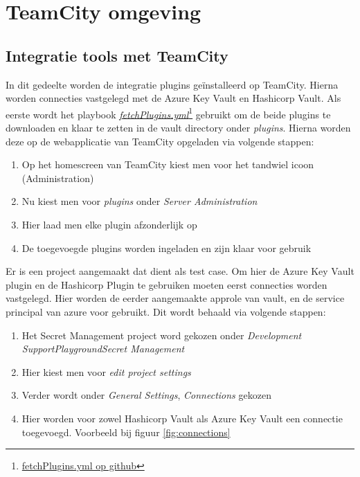 \section{TeamCity omgeving}
\subsection{Integratie tools met TeamCity}

In dit gedeelte worden de integratie plugins geïnstalleerd op TeamCity. Hierna worden connecties vastgelegd met de Azure Key Vault en Hashicorp Vault. Als eerste wordt het playbook \href{https://github.com/Rayenasr/Secrets-management-thesis/blob/main/vault/fetchPlugins.yml}{\textit{fetchPlugins.yml}}\footnote{\href{https://github.com/Rayenasr/Secrets-management-thesis/blob/main/vault/fetchPlugins.yml}{fetchPlugins.yml op github}} gebruikt om de beide plugins te downloaden en klaar te zetten in de vault directory onder \textit{plugins}. Hierna worden deze op de webapplicatie van TeamCity opgeladen via volgende stappen:

\begin{enumerate}
  \item Op het homescreen van TeamCity kiest men voor het tandwiel icoon (Administration)
  \item Nu kiest men voor \textit{plugins} onder \textit{Server Administration}
  \item Hier laad men elke plugin afzonderlijk op
  \item De toegevoegde plugins worden ingeladen en zijn klaar voor gebruik
\end{enumerate}

Er is een project aangemaakt dat dient als test case. Om hier de Azure Key Vault plugin en de Hashicorp Plugin te gebruiken moeten eerst connecties worden vastgelegd. Hier worden de eerder aangemaakte approle van vault, en de service principal van azure voor gebruikt. Dit wordt behaald via volgende stappen:

\begin{enumerate}
  \item Het Secret Management project word gekozen onder \textit{Development SupportPlaygroundSecret Management}
  \item Hier kiest men voor \textit{edit project settings}
  \item Verder wordt onder \textit{General Settings}, \textit{Connections} gekozen
  \item Hier worden voor zowel Hashicorp Vault als Azure Key Vault een connectie toegevoegd. Voorbeeld bij figuur \ref{fig:connections}
\end{enumerate}

